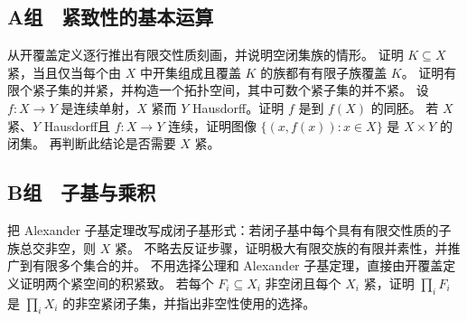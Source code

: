\subsection*{A组　紧致性的基本运算}
\begin{enumerate}[label=\textbf{\thechapter.\arabic*.}]
 从开覆盖定义逐行推出有限交性质刻画，并说明空闭集族的情形。
 证明 \(K\subseteq X\) 紧，当且仅当每个由 \(X\) 中开集组成且覆盖 \(K\) 的族都有有限子族覆盖 \(K\)。
 证明有限个紧子集的并紧，并构造一个拓扑空间，其中可数个紧子集的并不紧。
 设 \(f:X\to Y\) 是连续单射，\(X\) 紧而 \(Y\) Hausdorff。证明 \(f\) 是到 \(f(X)\) 的同胚。
 若 \(X\) 紧、\(Y\) Hausdorff且 \(f:X\to Y\) 连续，证明图像
 \(\{(x,f(x)):x\in X\}\) 是 \(X\times Y\) 的闭集。
 再判断此结论是否需要 \(X\) 紧。
\end{enumerate}

\subsection*{B组　子基与乘积}
\begin{enumerate}[label=\textbf{\thechapter.\arabic*.},resume]
 把 Alexander 子基定理改写成闭子基形式：若闭子基中每个具有有限交性质的子族总交非空，则 \(X\) 紧。
 不略去反证步骤，证明极大有限交族的有限并素性，并推广到有限多个集合的并。
 不用选择公理和 Alexander 子基定理，直接由开覆盖定义证明两个紧空间的积紧致。
 若每个 \(F_i\subseteq X_i\) 非空闭且每个 \(X_i\) 紧，证明
 \(\prod_iF_i\) 是 \(\prod_iX_i\) 的非空紧闭子集，并指出非空性使用的选择。
\end{enumerate}
